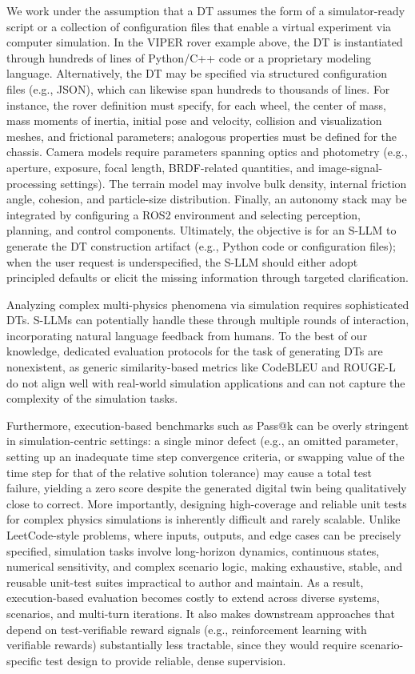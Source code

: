 We work under the assumption that a DT assumes the form of a simulator-ready script or a collection of configuration files that enable a virtual experiment via computer simulation. In the VIPER rover example above, the DT is instantiated through hundreds of lines of Python/C++ code or a proprietary modeling language. Alternatively, the DT may be specified via structured configuration files (e.g., JSON), which can likewise span hundreds to thousands of lines. For instance, the rover definition must specify, for each wheel, the center of mass, mass moments of inertia, initial pose and velocity, collision and visualization meshes, and frictional parameters; analogous properties must be defined for the chassis. Camera models require parameters spanning optics and photometry (e.g., aperture, exposure, focal length, BRDF-related quantities, and image-signal-processing settings). The terrain model may involve bulk density, internal friction angle, cohesion, and particle-size distribution. Finally, an autonomy stack may be integrated by configuring a ROS2 environment and selecting perception, planning, and control components. Ultimately, the objective is for an S-LLM to generate the DT construction artifact (e.g., Python code or configuration files); when the user request is underspecified, the S-LLM should either adopt principled defaults or elicit the missing information through targeted clarification.


Analyzing complex multi-physics phenomena via simulation requires sophisticated DTs. 
S-LLMs can potentially handle these through multiple rounds of interaction, 
incorporating natural language feedback from humans. 
To the best of our knowledge, dedicated evaluation protocols for the task of generating DTs are nonexistent, 
as generic similarity-based metrics like CodeBLEU \cite{ren2020codebleu} and ROUGE-L \cite{lin-2004-rouge} 
do not align well with real-world simulation applications and can not capture the complexity of the simulation tasks.

Furthermore, execution-based benchmarks such as Pass@k \cite{chen2021evaluating} can be overly stringent in simulation-centric settings: a single minor defect (e.g., an omitted parameter, setting up an inadequate time step convergence criteria, or swapping value of the time step for that of the relative solution tolerance) may cause a total test failure, yielding a zero score despite the generated digital twin being qualitatively close to correct. More importantly, designing high-coverage and reliable unit tests for complex physics simulations is inherently difficult and rarely scalable. Unlike LeetCode-style problems, where inputs, outputs, and edge cases can be precisely specified, simulation tasks involve long-horizon dynamics, continuous states, numerical sensitivity, and complex scenario logic, making exhaustive, stable, and reusable unit-test suites impractical to author and maintain. As a result, execution-based evaluation becomes costly to extend across diverse systems, scenarios, and multi-turn iterations. It also makes downstream approaches that depend on test-verifiable reward signals (e.g., reinforcement learning with verifiable rewards) substantially less tractable, since they would require scenario-specific test design to provide reliable, dense supervision.

